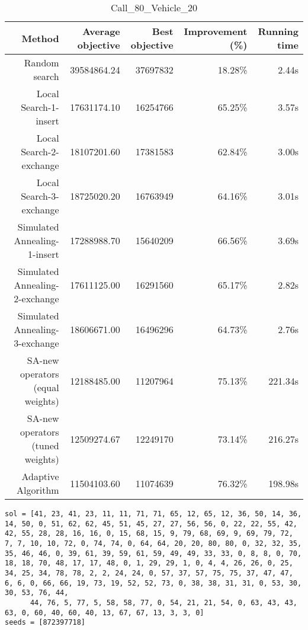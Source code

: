 \begin{table}[ht]
\centering
\caption{Call\_80\_Vehicle\_20}
\label{tab:call80vehicle20}
\begin{tabular}{|r|r|r|r|r|}
Method & Average objective & Best objective & Improvement (\%) & Running time \\
\hline
Random search & 39584864.24 & 37697832 & 18.28\% & 2.44s\\
Local Search-1-insert & 17631174.10 & 16254766 & 65.25\% & 3.57s\\
Local Search-2-exchange & 18107201.60 & 17381583 & 62.84\% & 3.00s\\
Local Search-3-exchange & 18725020.20 & 16763949 & 64.16\% & 3.01s\\
Simulated Annealing-1-insert & 17288988.70 & 15640209 & 66.56\% & 3.69s\\
Simulated Annealing-2-exchange & 17611125.00 & 16291560 & 65.17\% & 2.82s\\
Simulated Annealing-3-exchange & 18606671.00 & 16496296 & 64.73\% & 2.76s\\
SA-new operators (equal weights) & 12188485.00 & 11207964 & 75.13\% & 221.34s\\
SA-new operators (tuned weights) & 12509274.67 & 12249170 & 73.14\% & 216.27s\\
Adaptive Algorithm & 11504103.60 & 11074639 & 76.32\% & 198.98s\\
\end{tabular}%
\end{table}
\begin{lstlisting}[label={lst:call80vehicle20},caption=Optimal solution call\_80\_vehicle\_20]
sol = [41, 23, 41, 23, 11, 11, 71, 71, 65, 12, 65, 12, 36, 50, 14, 36, 14, 50, 0, 51, 62, 62, 45, 51, 45, 27, 27, 56, 56, 0, 22, 22, 55, 42, 42, 55, 28, 28, 16, 16, 0, 15, 68, 15, 9, 79, 68, 69, 9, 69, 79, 72, 7, 7, 10, 10, 72, 0, 74, 74, 0, 64, 64, 20, 20, 80, 80, 0, 32, 32, 35, 35, 46, 46, 0, 39, 61, 39, 59, 61, 59, 49, 49, 33, 33, 0, 8, 8, 0, 70, 18, 18, 70, 48, 17, 17, 48, 0, 1, 29, 29, 1, 0, 4, 4, 26, 26, 0, 25, 34, 25, 34, 78, 78, 2, 2, 24, 24, 0, 57, 37, 57, 75, 75, 37, 47, 47, 6, 6, 0, 66, 66, 19, 73, 19, 52, 52, 73, 0, 38, 38, 31, 31, 0, 53, 30, 30, 53, 76, 44,
      44, 76, 5, 77, 5, 58, 58, 77, 0, 54, 21, 21, 54, 0, 63, 43, 43, 63, 0, 60, 40, 60, 40, 13, 67, 67, 13, 3, 3, 0]
seeds = [872397718]
\end{lstlisting}%
\clearpage


